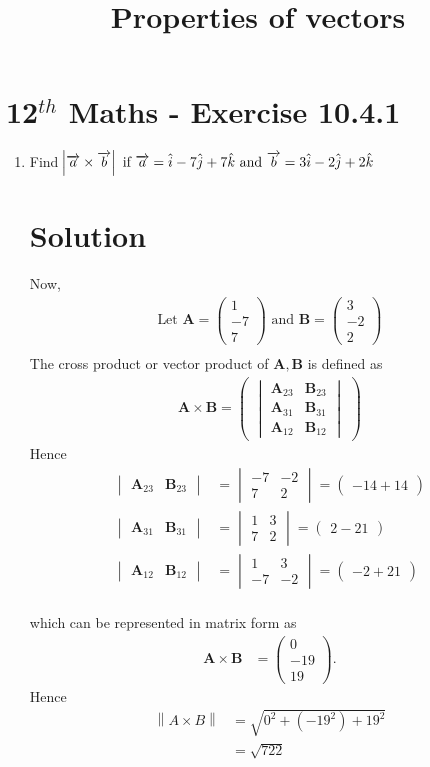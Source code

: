 \documentclass[12pt]{article}
\newcommand{\mydet}[1]{\ensuremath{\begin{vmatrix}#1\end{vmatrix}}}
\providecommand{\norm}[1]{\left\lVert#1\right\rVert}
\newcommand{\myvec}[1]{\ensuremath{\begin{pmatrix}#1\end{pmatrix}}}
\let\vec\mathbf
\begin{document}
\begin{center}
\title{\textbf{Properties of vectors}}
\date{\vspace{-5ex}} %
\maketitle
\end{center}
\setcounter{page}{1}
\section{12$^{th}$ Maths - Exercise 10.4.1}

\begin{enumerate}
\item Find $\abs{\overrightarrow{a}\times\overrightarrow{b}}\text{ if }\overrightarrow{a}=\hat{i}-7\hat{j}+7\hat{k}\text{ and }\overrightarrow{b}=3\hat{i}-2\hat{j}+2\hat{k}$
\section{Solution}
Now,
\begin{align}
\text{Let } \vec{A} = \myvec{1\\-7\\7} \text{ and } \vec{B} = \myvec{3\\ -2 \\ 2}\\
\end{align}
The cross product or vector product of $\vec{A},\vec{B}$ is defined as
\begin{align}
	\vec{A} \times \vec{B} = \myvec{\mydet{\vec{A}_{23}&\vec{B}_{23}\\\vec{A}_{31}&\vec{B}_{31}\\\vec{A}_{12}&\vec{B}_{12}}}
\end{align}
Hence
\begin{align}
	\mydet{\vec{A}_{23}&\vec{B}_{23}}&=\mydet{-7&-2\\7&2}=\myvec{-14+14}\\
	\mydet{\vec{A}_{31}&\vec{B}_{31}}&=\mydet{1&3\\7&2}=\myvec{2-21}\\
	\mydet{\vec{A}_{12}&\vec{B}_{12}}&=\mydet{1&3\\-7&-2}=\myvec{-2+21}\\
\end{align}

which can be represented in matrix form as
\begin{align}
	\vec{A} \times \vec{B}&=\myvec{0\\-19\\19}.
\end{align}
Hence
\begin{align}
\norm{{A} \times {B}}&=\sqrt{0^2+(-19^2)+19^2}\\
 &= \sqrt{722}
\end{align}

\end{enumerate}
\end{document}
